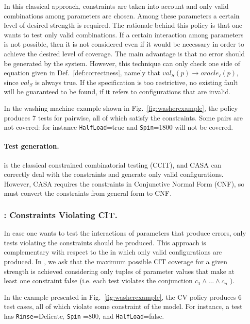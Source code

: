 \begin{tikzborder}{\cite{Gargantini16:validation}}
	In this classical approach, constraints are taken into account and only valid
	combinations among parameters are chosen. Among these parameters
	a certain level of desired strength is required. The rationale behind
	this policy is that one wants to test only valid combinations. If
	a certain interaction among parameters is not possible, then it is
	not considered even if it would be necessary in order to achieve the
	desired level of coverage. The main advantage is that no error should
	be generated by the system. However, this technique can only check
	one side of equation given in Def.~\ref{def:correctness}, namely
	that $val_{S}(p)\rightarrow$$oracle_{I}(p)$, since $val_{S}$ is always
	true. If the specification is too restrictive, %
	no existing fault will be guaranteed to be found, if it refers to configurations that are 
	invalid. %
	\begin{example}
		In the washing machine example shown in Fig.~\ref{fig:washerexample}, the \ccit policy produces 7 tests for pairwise, all of which satisfy the constraints. Some pairs are not covered: for instance \texttt{HalfLoad}=true and \texttt{Spin}=1800 will not be covered.
	\end{example}
	
	\paragraph*{Test generation.} \ccit is the classical constrained combinatorial testing (CCIT), and CASA can correctly deal with the constraints and generate only valid configurations. However, CASA requires the constraints in Conjunctive Normal Form (CNF), so \citlab must convert the constraints from general form to CNF.
	
	\subsubsection{\cv: Constraints Violating CIT.}
	In case one wants to test the interactions of parameters that produce errors, 
	only tests violating the constraints should be produced. This approach is complementary with respect to the \ccit in which only valid configurations are produced. In \cv, we ask that the maximum possible CIT coverage for a given strength is achieved considering only tuples of parameter values that make at least one constraint false (i.e. each test violates the conjunction $c_{1}\wedge \dots\wedge c_{n}$ ). 
	\begin{example}
		In the example presented in Fig.~\ref{fig:washerexample}, the CV policy produces 6 test cases, all of which violate some constraint of the model. For instance, a test has \texttt{Rinse}=Delicate, \texttt{Spin} =800, and \texttt{HalfLoad}=false.
	\end{example}

\end{tikzborder}
